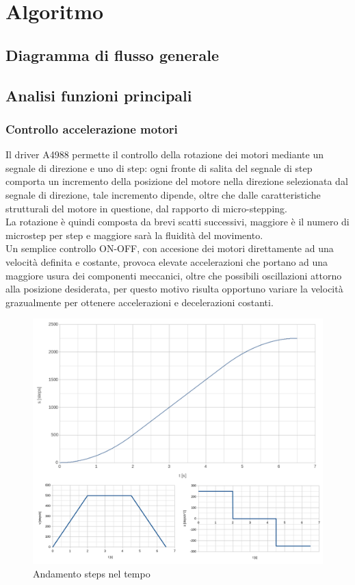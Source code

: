 \documentclass[12pt]{article}
\begin{document}
\section{Algoritmo}
    \subsection{Diagramma di flusso generale}

    \subsection{Analisi funzioni principali}
        \subsubsection{Controllo accelerazione motori}
        Il driver A4988 permette il controllo della rotazione dei motori mediante un segnale di direzione e uno di step: ogni fronte di salita del segnale di step comporta un incremento della posizione del motore nella direzione selezionata dal segnale di direzione, tale incremento dipende, oltre che dalle caratteristiche strutturali del motore in questione, dal rapporto di micro-stepping.\\
        La rotazione è quindi composta da brevi scatti successivi, maggiore è il numero di microstep per step e maggiore sarà la fluidità del movimento.\\
        Un semplice controllo ON-OFF, con accesione dei motori direttamente ad una velocità definita e costante, provoca elevate accelerazioni che portano ad una maggiore usura dei componenti meccanici, oltre che possibili oscillazioni attorno alla posizione desiderata, per questo motivo risulta opportuno variare la velocità grazualmente per ottenere accelerazioni e decelerazioni costanti.\\
        
        \begin{figure}[h]
        \centering
            \includegraphics[width=\textwidth-100pt]{Draws/Motors_s-v-a_block.png}
            \caption{Andamento steps nel tempo}
            \label{Steps_velocity_acceleration_in_time}
        \end{figure}
        
\end{document}
